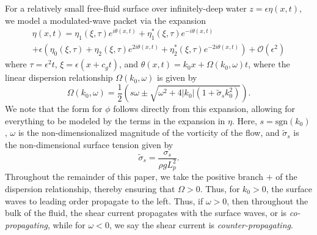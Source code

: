 \documentclass[a4paper,11pt]{article}
\begin{document}
For a relatively small free-fluid surface over infinitely-deep water $z=\epsilon \eta(x,t)$, we model a modulated-wave packet via the expansion 
\begin{multline*}
\eta(x,t) = \eta_{1}(\xi,\tau)e^{i\theta(x,t)} + \eta^{\ast}_{1}(\xi,\tau)e^{-i\theta(x,t)}\\
+ \epsilon\left(\eta_{0}(\xi,\tau) + \eta_{2}(\xi,\tau)e^{2i\theta(x,t)} + \eta^{\ast}_{2}(\xi,\tau)e^{-2i\theta(x,t)}\right) + \mathcal{O}\left(\epsilon^{2} \right)
\end{multline*}
where $\tau = \epsilon^{2}t$, $\xi = \epsilon(x+c_{g}t)$, and $\theta(x,t) = k_{0}x + \Omega(k_{0},\omega)t$, where the linear dispersion relationship $\Omega(k_{0},\omega)$ is given by
\[
\Omega(k_{0},\omega) = \frac{1}{2}\left(s\omega \pm \sqrt{\omega^{2} + 4|k_{0}|\left(1+\tilde{\sigma}_{s}k_{0}^{2}\right)} \right).
\]
We note that the form for $\phi$ follows directly from this expansion, allowing for everything to be modeled by the terms in the expansion in $\eta$.  Here, $s = \mbox{sgn}(k_{0})$, $\omega$ is the non-dimensionalized magnitude of the vorticity of the flow, and $\tilde{\sigma}_{s}$ is the non-dimensional surface tension given by
\[
\tilde{\sigma}_{s} = \frac{\sigma_{s}}{\rho g L_{p}^2}.
\]
Throughout the remainder of this paper, we take the positive branch $+$ of the dispersion relationship, thereby ensuring that $\Omega > 0$.  Thus, for $k_{0}>0$, the surface waves to leading order propagate to the left.  Thus, if $\omega>0$, then throughout the bulk of the fluid, the shear current propagates with the surface waves, or is {\it co-propagating}, while for $\omega<0$, we say the shear current is {\it counter-propagating}.  
\end{document}
